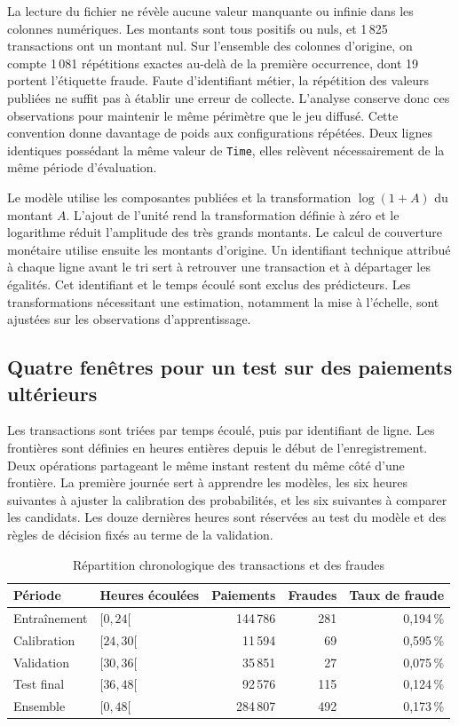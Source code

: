 \documentclass[11pt,a4paper]{article}
\begin{document}
La lecture du fichier ne révèle aucune valeur manquante ou infinie dans les colonnes numériques. Les montants sont tous positifs ou nuls, et 1\,825 transactions ont un montant nul. Sur l'ensemble des colonnes d'origine, on compte 1\,081 répétitions exactes au-delà de la première occurrence, dont 19 portent l'étiquette fraude. Faute d'identifiant métier, la répétition des valeurs publiées ne suffit pas à établir une erreur de collecte. L'analyse conserve donc ces observations pour maintenir le même périmètre que le jeu diffusé. Cette convention donne davantage de poids aux configurations répétées. Deux lignes identiques possédant la même valeur de \texttt{Time}, elles relèvent nécessairement de la même période d'évaluation.

Le modèle utilise les composantes publiées et la transformation $\log(1+A)$ du montant $A$. L'ajout de l'unité rend la transformation définie à zéro et le logarithme réduit l'amplitude des très grands montants. Le calcul de couverture monétaire utilise ensuite les montants d'origine. Un identifiant technique attribué à chaque ligne avant le tri sert à retrouver une transaction et à départager les égalités. Cet identifiant et le temps écoulé sont exclus des prédicteurs. Les transformations nécessitant une estimation, notamment la mise à l'échelle, sont ajustées sur les observations d'apprentissage.

\subsection{Quatre fenêtres pour un test sur des paiements ultérieurs}

Les transactions sont triées par temps écoulé, puis par identifiant de ligne. Les frontières sont définies en heures entières depuis le début de l'enregistrement. Deux opérations partageant le même instant restent du même côté d'une frontière. La première journée sert à apprendre les modèles, les six heures suivantes à ajuster la calibration des probabilités, et les six suivantes à comparer les candidats. Les douze dernières heures sont réservées au test du modèle et des règles de décision fixés au terme de la validation.

\begin{table}[htbp]
\centering
\caption{Répartition chronologique des transactions et des fraudes}
\label{tab:periodes-donnees}
\small
\begin{tabular}{@{}llrrr@{}}
\toprule
Période & Heures écoulées & Paiements & Fraudes & Taux de fraude \\
\midrule
Entraînement & $[0,24[$  & 144\,786 & 281 & 0,194\,\% \\
Calibration  & $[24,30[$ & 11\,594  & 69  & 0,595\,\% \\
Validation   & $[30,36[$ & 35\,851  & 27  & 0,075\,\% \\
Test final   & $[36,48[$ & 92\,576  & 115 & 0,124\,\% \\
\midrule
Ensemble     & $[0,48[$  & 284\,807 & 492 & 0,173\,\% \\
\bottomrule
\end{tabular}
\end{table}
\end{document}
